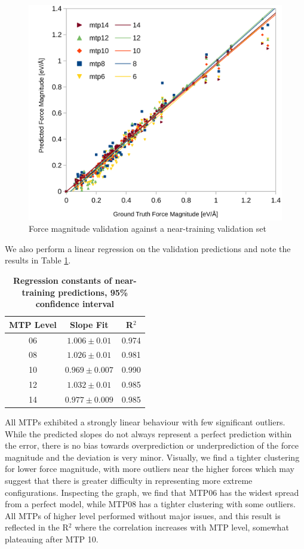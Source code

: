 \documentclass[9pt,twocolumn,twoside]{opticajnl}
\begin{document}
\begin{figure}[ht]
  \centering
  \includegraphics[width=\linewidth]{assets/configurations.png}
  \caption{Force magnitude validation against a near-training validation set}
  \label{fig:configs}
\end{figure}

We also perform a linear regression on the validation predictions and note the results in Table \ref{tab:configs}.

\begin{table}[htbp]
  \centering
  \caption{\bf Regression constants of near-training predictions, 95\% confidence interval }
  \begin{tabular}{ccc}
  \hline
  MTP Level & Slope Fit &  R$^2$\\ 
  \hline
  06 & $1.006 \pm 0.01$ & 0.974 \\
  08 & $1.026 \pm 0.01$ & 0.981  \\
  10 & $0.969 \pm 0.007$ & 0.990 \\
  12 & $1.032 \pm 0.01$ & 0.985 \\
  14 & $0.977 \pm 0.009$ & 0.985 \\
  \hline
  \end{tabular}
  \label{tab:configs}
\end{table}

All MTPs exhibited a strongly linear behaviour with few significant outliers. While the predicted slopes do not always represent a perfect prediction within the error, there is no bias towards overprediction or underprediction of the force magnitude and the deviation is very minor. Visually, we find a tighter clustering for lower force magnitude, with more outliers near the higher forces which may suggest that there is greater difficulty in representing more extreme configurations. Inspecting the graph, we find that MTP06 has the widest spread from a perfect model, while MTP08 has a tighter clustering with some outliers. All MTPs of higher level performed without major issues, and this result is reflected in the R$^2$ where the correlation increases with MTP level, somewhat plateauing after MTP 10.
\end{document}
